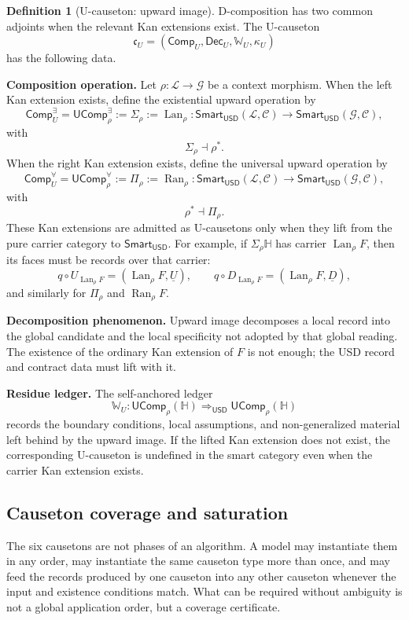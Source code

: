 \documentclass[11pt]{article}
\newcommand{\USD}{\mathsf{USD}}
\newcommand{\Smart}{\mathsf{Smart}}
\newcommand{\Lan}{\operatorname{Lan}}
\newcommand{\Ran}{\operatorname{Ran}}
\newcommand{\defeq}{\mathrel{:=}}
\newcommand{\UComp}{\mathsf{UComp}}
\newcommand{\Comp}{\mathsf{Comp}}
\newcommand{\Dec}{\mathsf{Dec}}
\theoremstyle{definition}
\newtheorem{definition}{Definition}[section]
\theoremstyle{plain}
\begin{document}
\begin{definition}[U-causeton: upward image]
D-composition has two common adjoints when the relevant Kan extensions
exist.  The U-causeton
\[
  \mathfrak c_U
  =
  (\Comp_U,\Dec_U,\mathbb W_U,\kappa_U)
\]
has the following data.

\textbf{Composition operation.}  Let $\rho:\mathcal L\to\mathcal G$ be a
context morphism.  When the left Kan extension exists, define the
existential upward operation by
\[
  \Comp_U^{\exists}
  =
  \UComp^{\exists}_{\rho}
  \defeq
  \Sigma_\rho
  \defeq
  \Lan_{\rho}:
  \Smart_{\USD}(\mathcal L,\mathcal C)\to
  \Smart_{\USD}(\mathcal G,\mathcal C),
\]
with
\[
  \Sigma_\rho\dashv \rho^*.
\]
When the right Kan extension exists, define the universal upward operation
by
\[
  \Comp_U^{\forall}
  =
  \UComp^{\forall}_{\rho}
  \defeq
  \Pi_\rho
  \defeq
  \Ran_{\rho}:
  \Smart_{\USD}(\mathcal L,\mathcal C)\to
  \Smart_{\USD}(\mathcal G,\mathcal C),
\]
with
\[
  \rho^*\dashv \Pi_\rho.
\]
These Kan extensions are admitted as U-causetons only when they lift from
the pure carrier category to $\Smart_{\USD}$.  For example, if
$\Sigma_\rho\mathbb H$ has carrier $\Lan_\rho F$, then its faces must be
records over that carrier:
\[
  q\circ U_{\Lan_\rho F}=(\Lan_\rho F,\underline U),
  \qquad
  q\circ D_{\Lan_\rho F}=(\Lan_\rho F,\underline D),
\]
and similarly for $\Pi_\rho$ and $\Ran_\rho F$.

\textbf{Decomposition phenomenon.}  Upward image decomposes a local record
into the global candidate and the local specificity not adopted by that
global reading.  The existence of the ordinary Kan extension of $F$ is not
enough; the USD record and contract data must lift with it.

\textbf{Residue ledger.}  The self-anchored ledger
\[
  \mathbb W_U:
  \UComp_{\rho}(\mathbb H)\Rightarrow_{\USD}\UComp_{\rho}(\mathbb H)
\]
records the boundary conditions, local assumptions, and non-generalized
material left behind by the upward image.  If the lifted Kan extension
does not exist, the corresponding U-causeton is undefined in the smart
category even when the carrier Kan extension exists.
\end{definition}

\subsection{Causeton coverage and saturation}

The six causetons are not phases of an algorithm.  A model may instantiate
them in any order, may instantiate the same causeton type more than once,
and may feed the records produced by one causeton into any other causeton
whenever the input and existence conditions match.  What can be required
without ambiguity is not a global application order, but a coverage
certificate.
\end{document}
